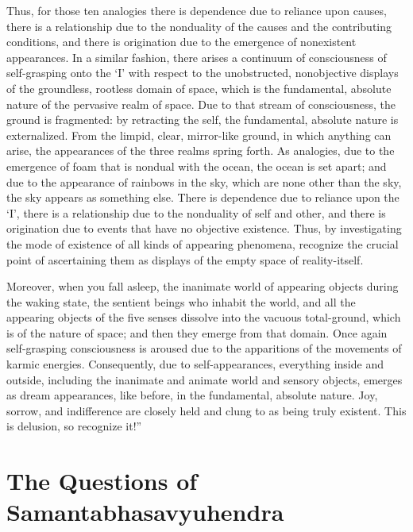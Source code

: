 \documentclass[a4paper,11pt,twoside,final]{book}
\begin{document}
Thus, for those ten analogies there is dependence due to reliance upon
causes, there is a relationship due to the nonduality of the causes
and the contributing conditions, and there is origination due to the
emergence of nonexistent appearances. In a similar fashion, there
arises a continuum of consciousness of self-grasping onto the `I' with
respect to the unobstructed, nonobjective displays of the groundless,
rootless domain of space, which is the fundamental, absolute nature of
the pervasive realm of space. Due to that stream of consciousness, the
ground is fragmented: by retracting the self, the fundamental,
absolute nature is externalized. From the limpid, clear, mirror-like
ground, in which anything can arise, the appearances of the three
realms spring forth. As analogies, due to the emergence of foam that
is nondual with the ocean, the ocean is set apart; and due to the
appearance of rainbows in the sky, which are none other than the sky,
the sky appears as something else.  There is dependence due to
reliance upon the `I', there is a relationship due to the nonduality of
self and other, and there is origination due to events that have no
objective existence. Thus, by investigating the mode of existence of
all kinds of appearing phenomena, recognize the crucial point of
ascertaining them as displays of the empty space of reality-itself.

Moreover, when you fall asleep, the inanimate world of appearing
objects during the waking state, the sentient beings who inhabit the
world, and all the appearing objects of the five senses dissolve into
the vacuous total-ground, which is of the nature of space; and then
they emerge from that domain. Once again self-grasping consciousness
is aroused due to the apparitions of the movements of karmic
energies. Consequently, due to self-appearances, everything inside and
outside, including the inanimate and animate world and sensory
objects, emerges as dream appearances, like before, in the
fundamental, absolute nature. Joy, sorrow, and indifference are
closely held and clung to as being truly existent. This is delusion,
so recognize it!''

\section{The Questions of Samantabhasavyuhendra} %
\end{document}

